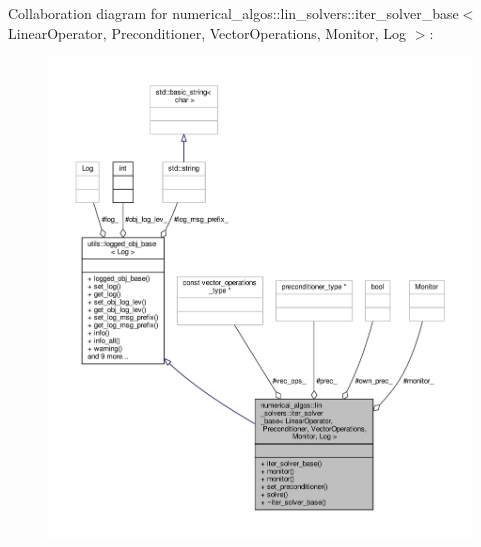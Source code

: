 Collaboration diagram for numerical\-\_\-algos\-:\-:lin\-\_\-solvers\-:\-:iter\-\_\-solver\-\_\-base$<$ Linear\-Operator, Preconditioner, Vector\-Operations, Monitor, Log $>$\-:\nopagebreak
\begin{figure}[H]
\begin{center}
\leavevmode
\includegraphics[width=350pt]{classnumerical__algos_1_1lin__solvers_1_1iter__solver__base__coll__graph}
\end{center}
\end{figure}
